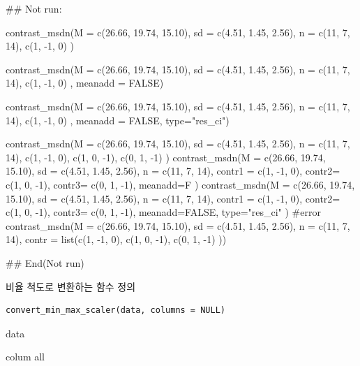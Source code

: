\documentclass[a4paper]{book}
\begin{document}
%
\begin{Examples}
\begin{ExampleCode}
## Not run: 


contrast_msdn(M = c(26.66, 19.74, 15.10),
              sd = c(4.51, 1.45, 2.56),
              n = c(11, 7, 14),
              c(1, -1, 0) )

contrast_msdn(M = c(26.66, 19.74, 15.10),
              sd = c(4.51, 1.45, 2.56),
              n = c(11, 7, 14),
              c(1, -1, 0) ,
              meanadd = FALSE)

contrast_msdn(M = c(26.66, 19.74, 15.10),
              sd = c(4.51, 1.45, 2.56),
              n = c(11, 7, 14),
              c(1, -1, 0) ,
             meanadd = FALSE,
              type="res_ci")


contrast_msdn(M = c(26.66, 19.74, 15.10),
              sd = c(4.51, 1.45, 2.56),
             n = c(11, 7, 14),
              c(1, -1,  0),
              c(1,  0, -1),
              c(0,  1, -1)
)
contrast_msdn(M = c(26.66, 19.74, 15.10),
              sd = c(4.51, 1.45, 2.56),
              n = c(11, 7, 14),
              contr1 = c(1, -1,  0),
              contr2= c(1,  0, -1),
              contr3= c(0,  1, -1),
              meanadd=F
)
contrast_msdn(M = c(26.66, 19.74, 15.10),
              sd = c(4.51, 1.45, 2.56),
              n = c(11, 7, 14),
             contr1 = c(1, -1,  0),
             contr2= c(1,  0, -1),
              contr3= c(0,  1, -1),
              meanadd=FALSE, type="res_ci"
)
#error
contrast_msdn(M = c(26.66, 19.74, 15.10),
              sd = c(4.51, 1.45, 2.56),
             n = c(11, 7, 14),
              contr = list(c(1, -1,  0),
                            c(1,  0, -1),
                           c(0,  1, -1)
              ))



## End(Not run)
\end{ExampleCode}
\end{Examples}
%
\begin{Description}
비율 척도로 변환하는 함수 정의
\end{Description}
%
\begin{Usage}
\begin{verbatim}
convert_min_max_scaler(data, columns = NULL)
\end{verbatim}
\end{Usage}
%
\begin{Arguments}
\begin{ldescription}
\item[\code{data}] data

\item[\code{columns}] colum all
\end{ldescription}
\end{Arguments}
\end{document}
